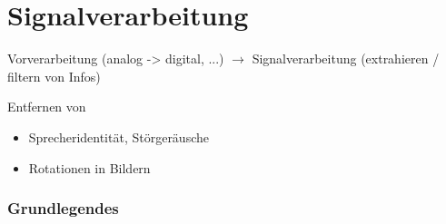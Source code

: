 
\chapter{Signalverarbeitung}

Vorverarbeitung (analog -> digital, ...)
$\rightarrow$
Signalverarbeitung (extrahieren / filtern von Infos)

Entfernen von
\begin{itemize}
	\item Sprecheridentität, Störgeräusche
	\item Rotationen in Bildern
\end{itemize}

\subsection{Grundlegendes}

